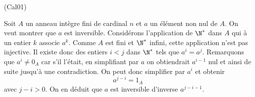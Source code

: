 \begin{tiny}(Cal01)\end{tiny} Soit $A$ un anneau intègre fini de cardinal $n$ et $a$ un élément non nul de $A$. On veut montrer que $a$ est inversible. Considérons l'application de $\N^*$ dans $A$ qui à un entier $k$ associe $a^k$. Comme $A$ est fini et $\N^*$ infini, cette application n'est pas injective. Il existe donc des entiers $i<j$ dans $\N^*$ tels que $a^i = a^j$.\newline
Remarquons que $a^i\neq 0_A$ car s'il l'était, en simplifiant par $a$ on obtiendrait $a^{i-1}$ nul et ainsi de suite jusqu'à une contradiction. On peut donc simplifier par $a^i$ et obtenir
\begin{displaymath}
 a^{j-i}=1_A
\end{displaymath}
avec $j-i>0$. On en déduit que $a$ est inversible d'inverse $a^{j-i-1}$. 